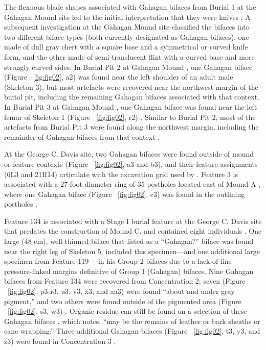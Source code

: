 \documentclass[review]{elsarticle}
\begin{document}
The flexuous blade shapes associated with Gahagan bifaces from Burial 1 at the Gahagan Mound site led to the initial interpretation that they were knives \citep[Figures 18-21]{RN2740}. A subsequent investigation at the Gahagan Mound site \citep{RN5274} classified the bifaces into two different biface types (both currently designated as Gahagan bifaces); one made of dull gray chert with a square base and a symmetrical or curved knife form, and the other made of semi-translucent flint with a curved base and more strongly curved sides. In Burial Pit 2 at Gahagan Mound \citep[Plate 21]{RN5274}, one Gahagan biface (Figure ~\ref{fig:fig02}, a2) \citep[Plate 27, No. 1, 3]{RN5274} was found near the left shoulder of an adult male (Skeleton 3), but most artefacts were recovered near the northwest margin of the burial pit, including the remaining Gahagan bifaces associated with that context. In Burial Pit 3 at Gahagan Mound \citep[Plate 23, 1]{RN5274}, one Gahagan biface was found near the left femur of Skeleton 1 (Figure ~\ref{fig:fig02}, r2) \citep[Plate 27, No. 1, 2]{RN5274}. Similar to Burial Pit 2, most of the artefacts from Burial Pit 3 were found along the northwest margin, including the remainder of Gahagan bifaces from that context \citep{RN5274}.

At the George C. Davis site, two Gahagan bifaces were found outside of mound or feature contexts (Figure ~\ref{fig:fig02}, a3 and b3), and their feature assignments (6L3 and 21R14) articulate with the excavation grid used by \cite{RN800}. Feature 3 is associated with a 27-foot diameter ring of 35 postholes located east of Mound A \citep[Figure 4]{RN800}, where one Gahagan biface (Figure ~\ref{fig:fig02}, c3) was found in the outlining postholes \citep{RN800}.

Feature 134 is associated with a Stage I burial feature at the George C. Davis site that predates the construction of Mound C, and contained eight individuals \citep{RN808,RN5050}. One large (48 cm), well-thinned biface that \citet[22]{RN808} listed as a “Gahagan?” biface was found near the right leg of Skeleton 5.  \citet[Figure 19x]{RN3684} included this specimen---and one additional large specimen from Feature 119 \citep[Figure 19w]{RN3684}---in his Group 2 bifaces due to a lack of fine pressure-flaked margins definitive of Group 1 (Gahagan) bifaces. Nine Gahagan bifaces from Feature 134 were recovered from Concentration 2; seven (Figure ~\ref{fig:fig02}, p3-r3, u3, v3, x3, and aa3) were found “about and under gray pigment,” and two others were found outside of the pigmented area (Figure ~\ref{fig:fig02}, s3, w3) \citep[21-23 and Figure 12]{RN808}. Organic residue can still be found on a selection of these Gahagan bifaces \citep[Figure 2]{RN11783}, which \citet[228]{RN3684} notes, “may be the remains of leather or bark sheaths or cane wrapping.” Three additional Gahagan bifaces (Figure ~\ref{fig:fig02}, t3, y3, and z3) were found in Concentration 3 \citep[21-22 and Figure 12]{RN808}.
\end{document}
